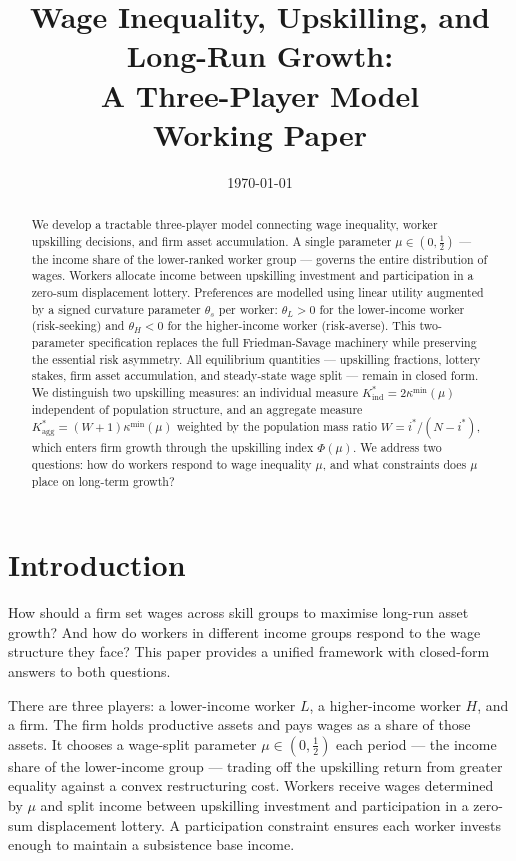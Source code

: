 \documentclass[12pt,a4paper]{article}
\title{\textbf{Wage Inequality, Upskilling, and Long-Run Growth:\\
A Three-Player Model}\\[0.8em]
\large Working Paper}
\author{}
\date{\today}
\begin{document}
\maketitle

\begin{abstract}
We develop a tractable three-player model connecting wage inequality,
worker upskilling decisions, and firm asset accumulation. A single
parameter $\mu \in (0,\tfrac{1}{2})$ --- the income share of the
lower-ranked worker group --- governs the entire distribution of wages.
Workers allocate income between upskilling investment and participation
in a zero-sum displacement lottery. Preferences are modelled using
linear utility augmented by a signed curvature parameter $\theta_s$
per worker: $\theta_L > 0$ for the lower-income worker (risk-seeking)
and $\theta_H < 0$ for the higher-income worker (risk-averse). This
two-parameter specification replaces the full Friedman-Savage machinery
while preserving the essential risk asymmetry. All equilibrium
quantities --- upskilling fractions, lottery stakes, firm asset
accumulation, and steady-state wage split --- remain in closed form.
We distinguish two upskilling measures: an individual measure
$K^*_{\mathrm{ind}} = 2\kappa^{\min}(\mu)$ independent of population
structure, and an aggregate measure
$K^*_{\mathrm{agg}} = (W+1)\kappa^{\min}(\mu)$ weighted by the
population mass ratio $W = i^*/(N-i^*)$, which enters firm growth
through the upskilling index $\Phi(\mu)$. We address two questions:
how do workers respond to wage inequality $\mu$, and what constraints
does $\mu$ place on long-term growth?
\end{abstract}

\tableofcontents
\newpage

\section{Introduction}

How should a firm set wages across skill groups to maximise long-run
asset growth? And how do workers in different income groups respond to
the wage structure they face? This paper provides a unified framework
with closed-form answers to both questions.

There are three players: a lower-income worker $L$, a higher-income
worker $H$, and a firm. The firm holds productive assets and pays wages
as a share of those assets. It chooses a wage-split parameter
$\mu \in (0, \tfrac{1}{2})$ each period --- the income share of the
lower-income group --- trading off the upskilling return from greater
equality against a convex restructuring cost. Workers receive wages
determined by $\mu$ and split income between upskilling investment and
participation in a zero-sum displacement lottery. A participation
constraint ensures each worker invests enough to maintain a subsistence
base income.
\end{document}

